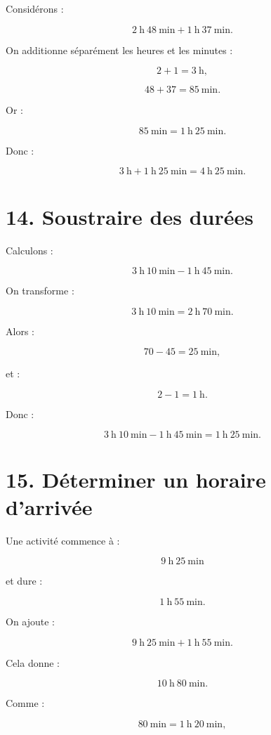 Considérons :

\[
2\ \text{h}\ 48\ \text{min}
+
1\ \text{h}\ 37\ \text{min}.
\]

On additionne séparément les heures et les minutes :

\[
2+1=3\ \text{h},
\]

\[
48+37=85\ \text{min}.
\]

Or :

\[
85\ \text{min}
=
1\ \text{h}\ 25\ \text{min}.
\]

Donc :

\[
3\ \text{h}
+
1\ \text{h}\ 25\ \text{min}
=
\boxed{4\ \text{h}\ 25\ \text{min}}.
\]

\section{14. Soustraire des durées}

Calculons :

\[
3\ \text{h}\ 10\ \text{min}
-
1\ \text{h}\ 45\ \text{min}.
\]

On transforme :

\[
3\ \text{h}\ 10\ \text{min}
=
2\ \text{h}\ 70\ \text{min}.
\]

Alors :

\[
70-45=25\ \text{min},
\]

et :

\[
2-1=1\ \text{h}.
\]

Donc :

\[
\boxed{
3\ \text{h}\ 10\ \text{min}
-
1\ \text{h}\ 45\ \text{min}
=
1\ \text{h}\ 25\ \text{min}
}.
\]

\section{15. Déterminer un horaire d’arrivée}

Une activité commence à :

\[
9\ \text{h}\ 25\ \text{min}
\]

et dure :

\[
1\ \text{h}\ 55\ \text{min}.
\]

On ajoute :

\[
9\ \text{h}\ 25\ \text{min}
+
1\ \text{h}\ 55\ \text{min}.
\]

Cela donne :

\[
10\ \text{h}\ 80\ \text{min}.
\]

Comme :

\[
80\ \text{min}
=
1\ \text{h}\ 20\ \text{min},
\]

